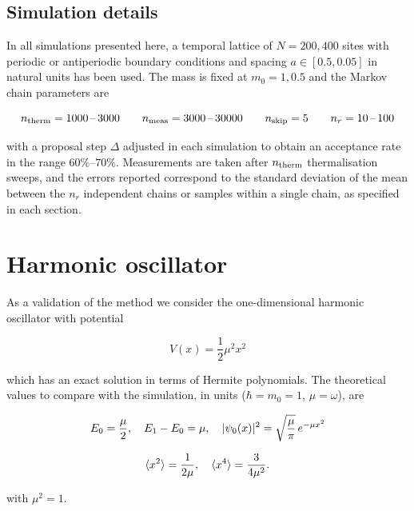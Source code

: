 \documentclass[11pt,a4paper,twoside,pdf]{article}
\numberwithin{equation}{section}
\begin{document}
\subsection{Simulation details}
\label{params}

In all simulations presented here, a temporal lattice of $N = 200, 400$ sites with periodic or antiperiodic boundary conditions and spacing $a \in [0.5, 0.05]$ in natural units has been used. The mass is fixed at $m_0 = 1, 0.5$ and the Markov chain parameters are

\begin{equation*}
    n_{\rm therm} = 1000 \,\text{--} \, 3000 \qquad n_{\rm meas} = 3000 \, \text{--} \, 30000 \qquad n_{\rm skip} = 5 \qquad n_r =  10 \, \text{--} \, 100
\end{equation*}

with a proposal step $\Delta$ adjusted in each simulation to obtain an acceptance rate in the range $60\%$--$70\%$. Measurements are taken after $n_{\rm therm}$ thermalisation sweeps, and the errors reported correspond to the standard deviation of the mean between the $n_r$ independent chains or samples within a single chain, as specified in each section.




\section{Harmonic oscillator}

As a validation of the method we consider the one-dimensional harmonic oscillator with potential

\begin{equation}
    V(x) = \frac{1}{2} \mu^2 x^2
\end{equation}

which has an exact solution in terms of Hermite polynomials. The theoretical values to compare with the simulation, in units ($\hbar = m_0 = 1$, $\mu = \omega$), are

\begin{equation}
    E_0 = \frac{\mu}{2}, \quad E_1 - E_0 = \mu, \quad |\psi_0(x)|^2 = \sqrt{\frac{\mu}{\pi}}\, e^{-\mu x^2}
    \notag
\end{equation}

\begin{equation}
    \braket{x^2} = \frac{1}{2\mu}, \quad \braket{x^4} = \frac{3}{4\mu^2}.
    \nonumber
\end{equation}

with $\mu^2 = 1$.
\end{document}

